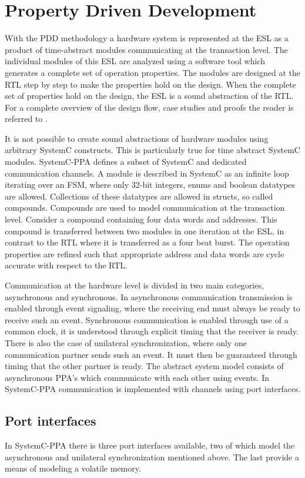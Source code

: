 \section{Property Driven Development}
\label{sec:pdd}
With the PDD methodology a hardware system is represented at the ESL as a product of time-abstract modules communicating at the transaction level. The individual modules of this ESL are analyzed using a software tool \cite{descam} which generates a complete set of operation properties. The modules are designed at the RTL step by step to make the properties hold on the design. When the complete set of properties hold on the design, the ESL is a sound abstraction of the RTL. For a complete overview of the design flow, case studies and proofs the reader is referred to \cite{pddref}. \par
It is not possible to create sound abstractions of hardware modules using arbitrary SystemC constructs. This is particularly true for time abstract SystemC modules. SystemC-PPA defines a subset of SystemC and dedicated communication channels. A module is described in SystemC as an infinite loop iterating over an FSM, where only 32-bit integers, enums and boolean datatypes are allowed. Collections of these datatypes are allowed in structs, so called compounds. Compounds are used to model communication at the transaction level. Consider a compound containing four data words and addresses. This compound is transferred between two modules in one iteration at the ESL, in contrast to the RTL where it is transferred as a four beat burst. The operation properties are refined such that appropriate address and data words are cycle accurate with respect to the RTL. \par
Communication at the hardware level is divided in two main categories, asynchronous and synchronous. In asynchronous communication transmission is enabled through event signaling, where the receiving end must always be ready to receive such an event. Synchronous communication is enabled through use of a common clock, it is understood through explicit timing that the receiver is ready. There is also the case of unilateral synchronization, where only one communication partner sends such an event. It must then be guaranteed through timing that the other partner is ready. The abstract system model consists of asynchronous PPA's which communicate with each other using events. In SystemC-PPA communication is implemented with channels using port interfaces.


\subsection{Port interfaces}
\label{subsec:ports}       
In SystemC-PPA there is three port interfaces available, two of which model the asynchronous and unilateral synchronization mentioned above. The last provide a means of modeling a volatile memory. 

